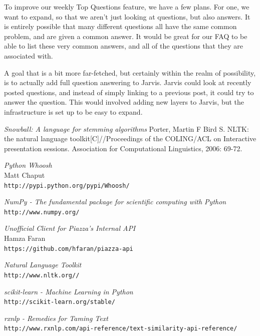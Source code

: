 \documentclass[sigconf]{acmart}
\begin{document}
To improve our weekly Top Questions feature, we have a few plans. For one, we want to expand, so that we aren't just looking at questions, but also answers. It is entirely possible that many different questions all have the same common problem, and are given a common answer. It would be great for our FAQ to be able to list these very common answers, and all of the questions that they are associated with.

A goal that is a bit more far-fetched, but certainly within the realm of possibility, is to actually add full question answering to Jarvis. Jarvis could look at recently posted questions, and instead of simply linking to a previous post, it could try to answer the question. This would involved adding new layers to Jarvis, but the infrastructure is set up to be easy to expand.



 

\begin{thebibliography}{9}


\textit{Snowball: A language for stemming algorithms} 
Porter, Martin F
Bird S. NLTK: the natural language toolkit[C]//Proceedings of the COLING/ACL on Interactive presentation sessions. Association for Computational Linguistics, 2006: 69-72.

\textit{Python Whoosh} 
\\ Matt Chaput
\\\texttt{http://pypi.python.org/pypi/Whoosh/}
 
\textit{NumPy - The fundamental package for scientific computing with Python} 
\\\texttt{http://www.numpy.org/} 

\textit{Unofficial Client for Piazza's Internal API} 
\\ Hamza Faran
\\\texttt{https://github.com/hfaran/piazza-api} 
 
\textit{Natural Language Toolkit} 
\\\texttt{http://www.nltk.org//}

\textit{scikit-learn - Machine Learning in Python} 
\\\texttt{http://scikit-learn.org/stable/}


\textit{rxnlp - Remedies for Taming Text} 
\\\texttt{http://www.rxnlp.com/api-reference/text-similarity-api-reference/}


\end{thebibliography}
\end{document}
